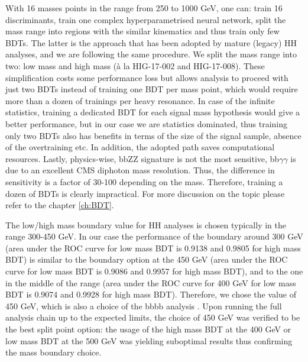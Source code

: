 With 16 masses points in the range from 250 to 1000 GeV, one can: train 16 discriminants, train one complex hyperparametrised neural network, split the mass range into regions with the similar kinematics and thus train only few BDTs. The latter is the approach that has been adopted by mature (legacy) HH analyses, and we are following the same procedure. We split the mass range into two: low mass and high mass (\`a la HIG-17-002 and HIG-17-008). These simplification costs some performance loss but allows analysis to proceed with just two BDTs instead of training one BDT per mass point, which would require more than a dozen of trainings per heavy resonance. In case of the infinite statistics, training a dedicated BDT for each
signal mass hypothesis would give a better performance, but in our case we are statistics dominated, thus training only two BDTs also has benefits in terms of the size of the signal sample, absence of the overtraining etc. In addition, the adopted path saves computational resources. Lastly, physics-wise, bbZZ signature is not the most sensitive, bb$\gamma$$\gamma$ is due to an excellent CMS diphoton mass resolution. Thus, the difference in sensitivity is a factor of 30-100 depending on the mass. Therefore, training a dozen of BDTs is clearly impractical. For more discussion on the topic please refer to the chapter \ref{ch:BDT}.





The low/high mass boundary value for HH analyses is chosen typically in the range 300-450
GeV. In our case the performance of the boundary around 300 GeV (area under the ROC curve
for low mass BDT is 0.9138 and 0.9805 for high mass BDT) is
similar to the boundary option at the 450 GeV (area under the ROC curve
for low mass BDT is 0.9086 and 0.9957 for high mass BDT), and to the one in the
middle of the range (area under the ROC curve
for 400 GeV for low mass BDT is 0.9074 and 0.9928 for high mass BDT). 
Therefore, we chose the value of 450 GeV, which
is also a choice of the bbbb analysis \cite{bbbb}. Upon running the full analysis chain up to the expected limits, the choice of 450 GeV was verified to be the best split point option: the usage of the high mass BDT at the 400 GeV or low mass BDT at the 500 GeV was yielding suboptimal results thus confirming the mass boundary choice. 

